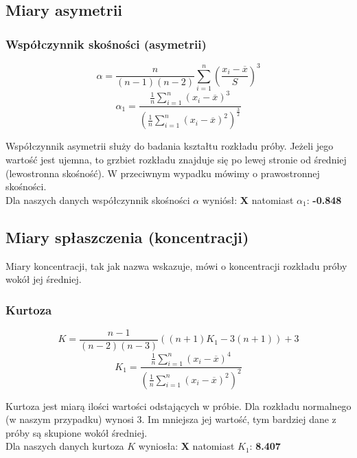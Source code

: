 \documentclass{article}
\theoremstyle{break}
\begin{document}
	\subsection{Miary asymetrii}
	\subsubsection*{Współczynnik skośności (asymetrii)}
	
	$$\alpha =\frac{n}{(n-1)(n-2)}\sum\limits_{i=1}^{n}(\frac{x_i-\overline{x}}{S})^3$$
	$$\alpha_1 =\frac{\frac{1}{n}\sum\limits_{i=1}^{n}(x_i-\overline{x})^3}{(\frac{1}{n}\sum\limits_{i=1}^{n}(x_i-\overline{x})^2)^{\frac{3}{2}}}$$
	
	Współczynnik asymetrii służy do badania kształtu rozkładu próby. Jeżeli jego wartość jest ujemna, to grzbiet rozkładu znajduje się po lewej stronie od średniej (lewostronna skośność). W przeciwnym wypadku mówimy o prawostronnej skośności. 
	\\Dla naszych danych współczynnik skośności $\alpha$ wyniósł: \textbf{X} natomiast $\alpha_1$: \textbf{-0.848}
	
	\subsection{Miary spłaszczenia (koncentracji)}
	
	Miary koncentracji, tak jak nazwa wskazuje, mówi o koncentracji rozkładu próby wokół jej średniej.
	
	\subsubsection*{Kurtoza}
	$$K=\frac{n-1}{(n-2)(n-3)}((n+1)K_1-3(n+1))+3$$
	$$K_1 =\frac{\frac{1}{n}\sum\limits_{i=1}^{n}(x_i-\overline{x})^4}{(\frac{1}{n}\sum\limits_{i=1}^{n}(x_i-\overline{x})^2)^2}$$
	
	Kurtoza jest miarą ilości wartości odstających w próbie. Dla rozkładu normalnego (w naszym przypadku) wynosi 3. Im mniejsza jej wartość, tym bardziej dane z próby są skupione wokół średniej.
	\\Dla naszych danych kurtoza $K$ wyniosła: \textbf{X} natomiast $K_1$: \textbf{8.407}
	
\end{document}
